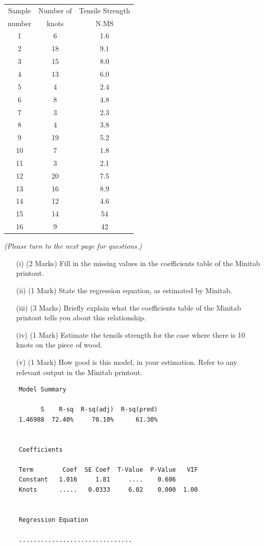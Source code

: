 \documentclass[a4paper,12pt]{article}
\begin{document}
	
\begin{table}[ht]
	\centering
\begin{tabular}{|c|c|c|}
	\hline
	Sample &  Number of & Tensile Strength  \\
    number    &   knots  &  N.MS \\
	 \hline	\hline
		1 & 6 & 1.6\\
		2 & 18 & 9.1\\
		3 & 15 & 8.0\\
		4 & 13 & 6.0\\
		5 & 4 & 2.4\\
		6 & 8 & 4.8\\
		7 & 3 & 2.3\\
		8 & 4 & 3.8\\
		9 & 19 & 5.2\\
		10 & 7 & 1.8\\
		11 & 3 & 2.1\\
		12 & 20 & 7.5\\
		13 & 16 & 8.9\\
		14 & 12 & 4.6\\
		15 & 14 & 54  \\
		16 & 9 & 42  \\
		\hline
	\end{tabular}
\end{table}
\textit{(Please turn to the next page for questions.)}
\newpage
\begin{itemize}
	\item[(i)] (2 Marks) Fill in the missing values in the coefficients table of the Minitab printout.
	\item[(ii)] (1 Mark) State the regression equation, as estimated by Minitab.
	\item[(iii)] (3 Marks) Briefly explain what the coefficients table of the Minitab printout tells you about this relationship. 
	\item[(iv)] (1 Mark) Estimate the tensils strength for the case where there is 10 knots on the piece of wood.
 \item[(v)] (1 Mark) How good is this model, in your estimation. Refer to any relevant output in the Minitab printout.
\end{itemize}


\begin{framed}
	\begin{verbatim}
	Model Summary
	
	      S    R-sq  R-sq(adj)  R-sq(pred)
	1.46988  72.40%     70.10%      61.30%
	
	
	Coefficients
	
	Term        Coef  SE Coef  T-Value  P-Value   VIF
	Constant   1.016     1.81     ....    0.606
	Knots      .....   0.0333     6.02    0.000  1.00
	
	
	Regression Equation
	
	...............................
	

	\end{verbatim}
\end{framed}
\end{document}
